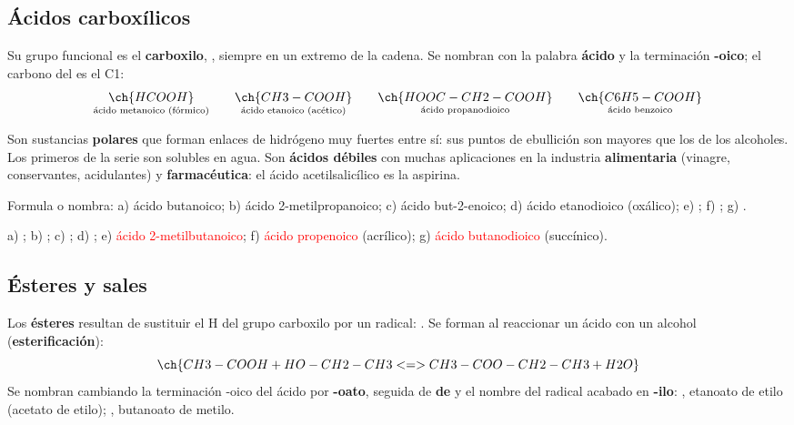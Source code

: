 \subsection{Ácidos carboxílicos}

Su grupo funcional es el \textbf{carboxilo}, , siempre en un extremo de la cadena. Se nombran con la palabra
\textbf{ácido} y la terminación \textbf{-oico}; el carbono del  es el C1:
\[ \underset{\text{ácido metanoico (fórmico)}}{\ch{HCOOH}} \qquad \underset{\text{ácido etanoico (acético)}}{\ch{CH3-COOH}}
   \qquad \underset{\text{ácido propanodioico}}{\ch{HOOC-CH2-COOH}} \qquad \underset{\text{ácido benzoico}}{\ch{C6H5-COOH}} \]

Son sustancias \textbf{polares} que forman enlaces de hidrógeno muy fuertes entre sí: sus puntos de ebullición son mayores que los
de los alcoholes. Los primeros de la serie son solubles en agua. Son \textbf{ácidos débiles} con muchas aplicaciones en la industria
\textbf{alimentaria} (vinagre, conservantes, acidulantes) y \textbf{farmacéutica}: el ácido acetilsalicílico es la aspirina.

\begin{exercise}
    Formula o nombra: a) ácido butanoico; b) ácido 2-metilpropanoico; c) ácido but-2-enoico; d) ácido etanodioico (oxálico); e)
    ; f) ; g) .
    \begin{solu}
        a) \textcolor{red}{}; b) \textcolor{red}{};
        c) \textcolor{red}{}; d) \textcolor{red}{}; e) \textcolor{red}{ácido 2-metilbutanoico};
        f) \textcolor{red}{ácido propenoico} (acrílico); g) \textcolor{red}{ácido butanodioico} (succínico).
    \end{solu}
\end{exercise}

\subsection{Ésteres y sales}

Los \textbf{ésteres} resultan de sustituir el H del grupo carboxilo por un radical: . Se forman al reaccionar un
ácido con un alcohol (\textbf{esterificación}):
\[ \ch{CH3-COOH + HO-CH2-CH3 <=> CH3-COO-CH2-CH3 + H2O} \]
Se nombran cambiando la terminación -oico del ácido por \textbf{-oato}, seguida de \textbf{de} y el nombre del radical acabado en
\textbf{-ilo}: , etanoato de etilo (acetato de etilo); , butanoato de metilo.

